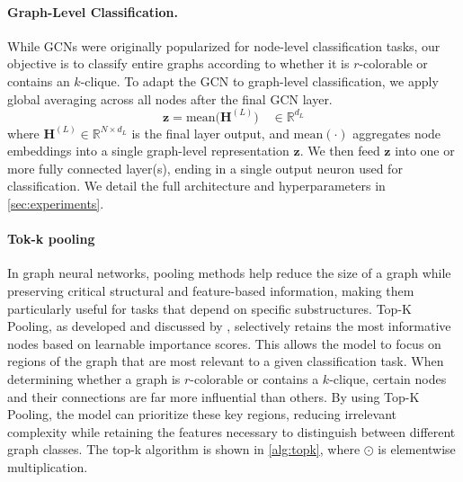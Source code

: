 \paragraph{Graph-Level Classification.}
While GCNs were originally popularized for node-level classification tasks, our objective is
to classify entire graphs according to whether it is $r$-colorable or contains an $k$-clique. To adapt the GCN to graph-level classification, we apply global averaging across all nodes after the final GCN layer.
\begin{equation}
   \mathbf{z} 
   = \mathrm{mean}\bigl(\mathbf{H}^{(L)}\bigr) \quad \in \mathbb{R}^{d_L}
\end{equation}
where $\mathbf{H}^{(L)} \in \mathbb{R}^{N \times d_{L}}$ is the final layer output, and
$\mathrm{mean}(\cdot)$ aggregates node embeddings into a single graph-level representation $\mathbf{z}$. We then feed $\mathbf{z}$ into one or more fully connected layer(s), ending in a single output neuron used for classification. We detail the full architecture and hyperparameters in \cref{sec:experiments}.

\paragraph{Tok-k pooling}

In graph neural networks, pooling methods help reduce the size of a graph while preserving critical structural and feature-based information, making them particularly useful for tasks that depend on specific substructures. Top-K Pooling, as developed and discussed by \citet{topk1,topk2,topk3}, selectively retains the most informative nodes based on learnable importance scores. This allows the model to focus on regions of the graph that are most relevant to a given classification task. When determining whether a graph is $r$-colorable or contains a $k$-clique, certain nodes and their connections are far more influential than others. By using Top-K Pooling, the model can prioritize these key regions, reducing irrelevant complexity while retaining the features necessary to distinguish between different graph classes. The top-k algorithm is shown in \cref{alg:topk}, where $\odot$ is elementwise multiplication.

